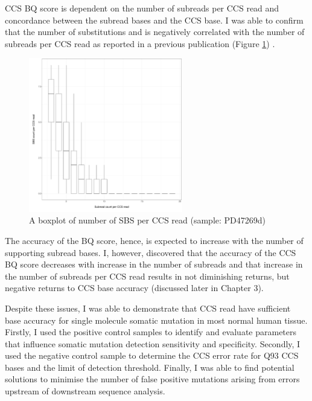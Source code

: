 
CCS BQ score is dependent on the number of subreads per CCS read and concordance between the subread bases and the CCS base. I was able to confirm that the number of substitutions and is negatively correlated with the number of subreads per CCS read as reported in a previous publication (Figure \ref{figure:sbs-count-per-ccs-read}) \cite{Wenger2019-pw}. 

\begin{figure}[htbp!]
\caption{A boxplot of number of SBS per CCS read (sample: PD47269d)}
\label{figure:sbs-count-per-ccs-read}
\begin{centering}
\includegraphics[width=0.6\textwidth]{Vector/sbs_count_per_ccs_read.pdf}
\end{centering}
\end{figure}

The accuracy of the BQ score, hence, is expected to increase with the number of supporting subread bases. I, however, discovered that the accuracy of the CCS BQ score decreases with increase in the number of subreads and that increase in the number of subreads per CCS read results in not diminishing returns, but negative returns to CCS base accuracy (discussed later in Chapter 3). 

Despite these issues, I was able to demonstrate that CCS read have sufficient base accuracy for single molecule somatic mutation in most normal human tissue. Firstly, I used the positive control samples to identify and evaluate parameters that influence somatic mutation detection sensitivity and specificity. Secondly, I used the negative control sample to determine the CCS error rate for Q93 CCS bases and the limit of detection threshold. Finally, I was able to find potential solutions to minimise the number of false positive mutations arising from errors upstream of downstream sequence analysis. 


